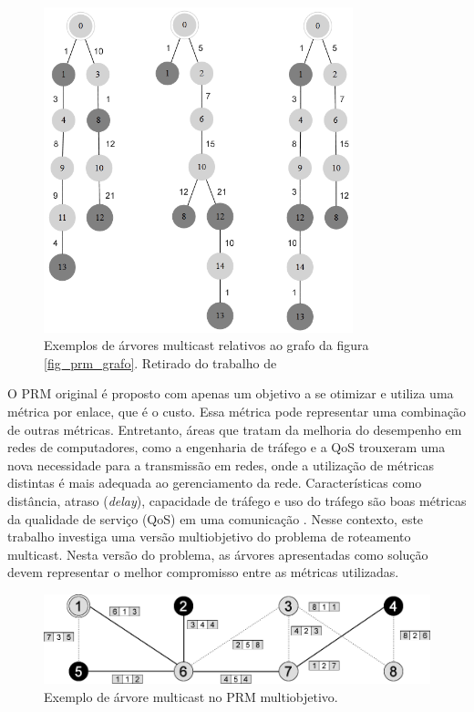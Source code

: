 \begin{figure}[!htbp]
	\centering
	\includegraphics[width=0.8\textwidth]{cap_problemas/figs/prm_mono}
	\caption{\label{fig_prm_mono}Exemplos de árvores multicast relativos ao grafo da figura \autoref{fig_prm_grafo}. Retirado do trabalho de \cite{LafetaThesis}}
\end{figure}

O PRM original é proposto com apenas um objetivo a se otimizar e utiliza uma métrica por enlace, que é o custo. Essa métrica pode representar uma combinação de outras métricas. Entretanto, áreas que tratam da melhoria do desempenho em redes de computadores, como a engenharia de tráfego e a \ac{QoS} trouxeram uma nova necessidade para a transmissão em redes, onde a utilização de métricas distintas é mais adequada ao gerenciamento da rede. Características como distância, atraso (\textit{delay}), capacidade de tráfego e uso do tráfego são boas métricas da qualidade de serviço (QoS) em uma comunicação \cite{LafetaThesis}. Nesse contexto, este trabalho investiga uma versão multiobjetivo do problema de roteamento multicast. Nesta versão do problema, as árvores apresentadas como solução devem representar o melhor compromisso entre as métricas utilizadas.

\begin{figure}
	\centering
	\includegraphics[width=1\textwidth]{cap_problemas/figs/prm_multi}
	\caption{\label{fig_prm_multi}Exemplo de árvore multicast no PRM multiobjetivo.}
\end{figure}

